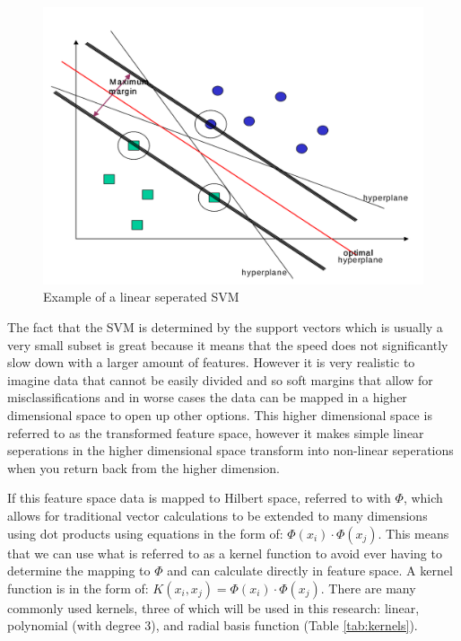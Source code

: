 \begin{figure}
	\label{fig:svmmargin}
	\includegraphics[width=450px]{./assets/img/svmmargin.png}
	\caption{Example of a linear seperated SVM}
\end{figure}

The fact that the SVM is determined by the support vectors which is usually a very small subset is great because it means that the speed does not significantly slow down with a larger amount of features.  However it is very realistic to imagine data that cannot be easily divided and so soft margins that allow for misclassifications and in worse cases the data can be mapped in a higher dimensional space to open up other options.  This higher dimensional space is referred to as the transformed feature space, however it makes simple linear seperations in the higher dimensional space transform into non-linear seperations when you return back from the higher dimension.  

If this feature space data is mapped to Hilbert space, referred to with $\Phi$, which allows for traditional vector calculations to be extended to many dimensions using dot products using equations in the form of: $\Phi\left(x_i \right)\cdot\Phi\left(x_j \right)$.  This means that we can use what is referred to as a kernel function to avoid ever having to determine the mapping to $\Phi$ and can calculate directly in feature space.  A kernel function is in the form of: $K(x_{i},x_{j}) = \Phi(x_i) \cdot \Phi(x_j)$. %
There are many commonly used kernels, three of which will be used in this research: linear, polynomial (with degree 3), and radial basis function (Table \ref{tab:kernels}).  

